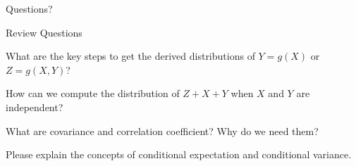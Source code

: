 \begin{frame}{}
\vspace{2cm}
\LARGE Questions?

\end{frame}

\begin{frame}{Review Questions}

\bce[1)]
\item What are the key steps to get the derived distributions of $Y=g(X)$ or $Z=g(X,Y)$?

\item How can we compute the distribution of $Z+X+Y$ when $X$ and $Y$ are independent?

\item What are covariance and correlation coefficient? Why do we need them?

\item Please explain the concepts of conditional expectation and conditional variance.

\ece

\end{frame}


